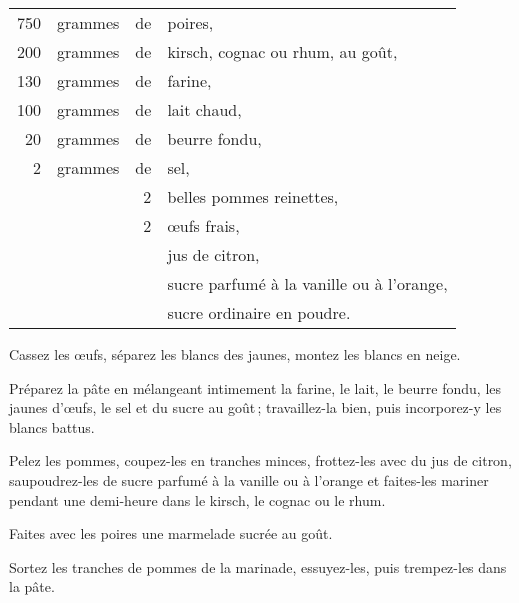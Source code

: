 \footnotesize
\begin{longtable}{rrrp{16em}}
    750 & grammes & de & poires,                                                                          \\
    200 & grammes & de & kirsch, cognac ou rhum, au goût,                                                 \\
    130 & grammes & de & farine,                                                                          \\
    100 & grammes & de & lait chaud,                                                                      \\
     20 & grammes & de & beurre fondu,                                                                    \\
      2 & grammes & de & sel,                                                                             \\
        &         &  2 & belles pommes reinettes,                                                         \\
        &         &  2 & œufs frais,                                                                      \\
        &         &    & jus de citron,                                                                   \\
        &         &    & sucre parfumé à la vanille ou à l'orange,                                        \\
        &         &    & sucre ordinaire en poudre.                                                       \\
\end{longtable}
\normalsize

Cassez les œufs, séparez les blancs des jaunes, montez les blancs en neige.

Préparez la pâte en mélangeant intimement la farine, le lait, le beurre fondu,
les jaunes d'œufs, le sel et du sucre au goût ; travaillez-la bien, puis
incorporez-y les blancs battus.

Pelez les pommes, coupez-les en tranches minces, frottez-les avec du jus de
citron, saupoudrez-les de sucre parfumé à la vanille ou à l'orange et faites-les
mariner pendant une demi-heure dans le kirsch, le cognac ou le rhum.

Faites avec les poires une marmelade sucrée au goût.

Sortez les tranches de pommes de la marinade, essuyez-les, puis trempez-les
dans la pâte.

